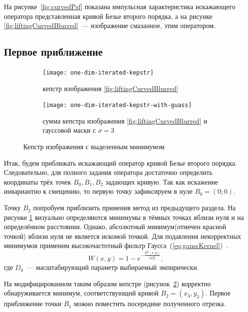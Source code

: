 На рисунке~\ref{fig:curvedPsf} показана импульсная характеристика искажающего оператора представленная кривой Безье второго порядка, а на рисунке \ref{fig:liftingCurvedBlurred}~--- изображение смазанное, этим оператором.

\subsection{Первое приближение}
\begin{figure}[h!]
	\begin{subfigure}[t]{0.5\textwidth}
		\texttt{[image: one-dim-iterated-kepstr]}
		\caption{кепстр изображения \ref{fig:liftingCurvedBlurred}}
		\label{fig:curvedKepstrUnmodified}
	\end{subfigure}
	\begin{subfigure}[t]{0.5\textwidth}
		\texttt{[image: one-dim-iterated-kepstr-with-guass]}
		\caption{сумма кепстра изображения \ref{fig:liftingCurvedBlurred} и гауссовой маски с $\sigma=3$}
		\label{fig:curvedKepstrWithGauss}
	\end{subfigure}
	\caption{Кепстр изображения с выделенным минимумом}
	\label{fig:}
\end{figure}

Итак, будем приближать искажающий оператор кривой Безье второго порядка. Следовательно, для полного задания оператора достаточно определить координаты трёх точек $B_0, B_1, B_2$ задающих кривую. Так как искажение инвариантно к смещению, то первую точку зафиксируем в нуле $B_0 = (0;0)$.

Точку $B_2$ попробуем приблизить применив метод из предыдущего раздела. На рисунке \ref{fig:curvedKepstrUnmodified} визуально определяются минимумы в тёмных точках вблизи нуля и на определённом расстоянии. Однако, абсолютный минимум(отмечен красной точкой) вблизи нуля не является искомой точкой. Для подавления некорректных минимумов применим высокочастотный фильтр Гаусса~(\ref{eq:gaussKernel})~\cite{basicsOfDigitalDIP200}.
\begin{equation}\label{eq:gaussKernel}
	W(x,y) = 1 - e^{-\frac{D^2(x,y)}{2D_0^2}},
\end{equation}
где $D_0$~--- масштабирующий параметр выбираемый эмпирически.

На модифицированном таким образом кепстре (рисунок~\ref{fig:curvedKepstrWithGauss}) корректно обнаруживается минимум, соответствующий кривой $B_2=(x_3,y_3)$. Первое приближение точки $B_1$ можно поместить посередине полученного отрезка.

